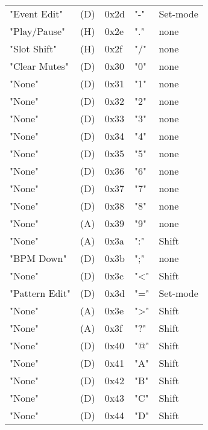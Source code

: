 \begin{table}[htb]
\begin{tabular}{l l l l l}
        "Event Edit"         & (D)  &  0x2d   & "-"          & Set-mode \\
        "Play/Pause"         & (H)  &  0x2e   & "."          & none \\
        "Slot Shift"         & (H)  &  0x2f   & "/"          & none \\
        "Clear Mutes"        & (D)  &  0x30   & "0"          & none \\
        "None"               & (D)  &  0x31   & "1"          & none \\
        "None"               & (D)  &  0x32   & "2"          & none \\
        "None"               & (D)  &  0x33   & "3"          & none \\
        "None"               & (D)  &  0x34   & "4"          & none \\
        "None"               & (D)  &  0x35   & "5"          & none \\
        "None"               & (D)  &  0x36   & "6"          & none \\
        "None"               & (D)  &  0x37   & "7"          & none \\
        "None"               & (D)  &  0x38   & "8"          & none \\
        "None"               & (A)  &  0x39   & "9"          & none \\
        "None"               & (A)  &  0x3a   & ":"          & Shift \\
        "BPM Down"           & (D)  &  0x3b   & ";"          & none \\
        "None"               & (D)  &  0x3c   & "<"          & Shift \\
        "Pattern Edit"       & (D)  &  0x3d   & "="          & Set-mode \\
        "None"               & (A)  &  0x3e   & ">"          & Shift \\
        "None"               & (A)  &  0x3f   & "?"          & Shift \\
        "None"               & (D)  &  0x40   & "@"          & Shift \\
        "None"               & (D)  &  0x41   & "A"          & Shift \\
        "None"               & (D)  &  0x42   & "B"          & Shift \\
        "None"               & (D)  &  0x43   & "C"          & Shift \\
        "None"               & (D)  &  0x44   & "D"          & Shift \\

\end{tabular}
\end{table}
